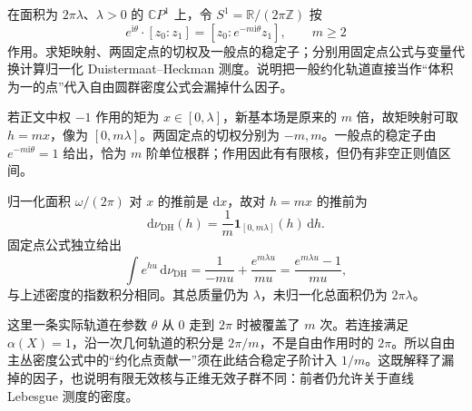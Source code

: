 \begin{optionalexercise}\label{g4:ex:1206:ineffective-sphere}
	在面积为 \(2\pi\lambda\)、\(\lambda>0\) 的 \(\mathbb CP^1\) 上，令 \(S^1=\mathbb R/(2\pi\mathbb Z)\) 按
	\[
		e^{\mathrm{i}\theta}\cdot[z_0:z_1]
		=[z_0:e^{-m\mathrm{i}\theta}z_1],
		\qquad m\ge2
	\]
	作用。求矩映射、两固定点的切权及一般点的稳定子；分别用固定点公式与变量代换计算归一化 Duistermaat--Heckman 测度。说明把一般约化轨道直接当作“体积为一的点”代入自由圆群密度公式会漏掉什么因子。
\end{optionalexercise}
\begin{solution}
	若正文中权 \(-1\) 作用的矩为 \(x\in[0,\lambda]\)，新基本场是原来的 \(m\) 倍，故矩映射可取 \(h=mx\)，像为 \([0,m\lambda]\)。两固定点的切权分别为 \(-m,m\)。一般点的稳定子由 \(e^{-m\mathrm{i}\theta}=1\) 给出，恰为 \(m\) 阶单位根群；作用因此有有限核，但仍有非空正则值区间。

	归一化面积 \(\omega/(2\pi)\) 对 \(x\) 的推前是 \(\mathrm{d}x\)，故对 \(h=mx\) 的推前为
	\[
		\mathrm{d}\nu_{\mathrm{DH}}(h)
		=\frac1m\mathbf1_{[0,m\lambda]}(h)\,\mathrm{d}h.
	\]
	固定点公式独立给出
	\[
		\int e^{hu}\,\mathrm{d}\nu_{\mathrm{DH}}
		=\frac1{-mu}+\frac{e^{m\lambda u}}{mu}
		=\frac{e^{m\lambda u}-1}{mu},
	\]
	与上述密度的指数积分相同。其总质量仍为 \(\lambda\)，未归一化总面积仍为 \(2\pi\lambda\)。

	这里一条实际轨道在参数 \(\theta\) 从 \(0\) 走到 \(2\pi\) 时被覆盖了 \(m\) 次。若连接满足 \(\alpha(X)=1\)，沿一次几何轨道的积分是 \(2\pi/m\)，不是自由作用时的 \(2\pi\)。所以自由主丛密度公式中的“约化点贡献一”须在此结合稳定子阶计入 \(1/m\)。这既解释了漏掉的因子，也说明有限无效核与正维无效子群不同：前者仍允许关于直线 Lebesgue 测度的密度。
\end{solution}

